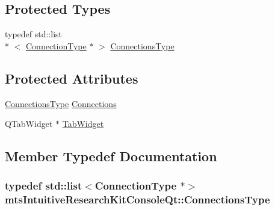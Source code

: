 \subsection*{Protected Types}
\begin{DoxyCompactItemize}
\item 
typedef std\-::list\\*
$<$ \hyperlink{classmts_intuitive_research_kit_console_qt_1_1_connection_type}{Connection\-Type} $\ast$ $>$ \hyperlink{classmts_intuitive_research_kit_console_qt_a4109ab2dff0b8b5632e7e220f1715c4c}{Connections\-Type}
\end{DoxyCompactItemize}
\subsection*{Protected Attributes}
\begin{DoxyCompactItemize}
\item 
\hyperlink{classmts_intuitive_research_kit_console_qt_a4109ab2dff0b8b5632e7e220f1715c4c}{Connections\-Type} \hyperlink{classmts_intuitive_research_kit_console_qt_a5fa2b0ac763cd34f9434e1b635cb0504}{Connections}
\item 
Q\-Tab\-Widget $\ast$ \hyperlink{classmts_intuitive_research_kit_console_qt_a5c8b728139b7d4037c4f43ca2bdc3d96}{Tab\-Widget}
\end{DoxyCompactItemize}


\subsection{Member Typedef Documentation}
\hypertarget{classmts_intuitive_research_kit_console_qt_a4109ab2dff0b8b5632e7e220f1715c4c}{
\subsubsection[{Connections\-Type}]{\setlength{\rightskip}{0pt plus 5cm}typedef std\-::list$<${\bf Connection\-Type} $\ast$$>$ {\bf mts\-Intuitive\-Research\-Kit\-Console\-Qt\-::\-Connections\-Type}\hspace{0.3cm}{\ttfamily [protected]}}}\label{classmts_intuitive_research_kit_console_qt_a4109ab2dff0b8b5632e7e220f1715c4c}


